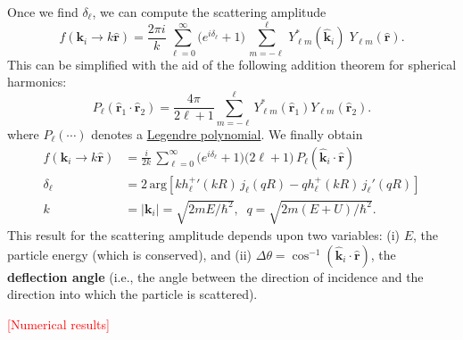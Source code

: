 \documentclass[pra,12pt]{revtex4}
\begin{document}
Once we find $\delta_\ell$, we can compute the scattering amplitude
$$f(\mathbf{k}_i\rightarrow k\hat{\mathbf{r}}) = \frac{2 \pi i}{k}\, \sum_{\ell =0}^\infty \big(e^{i\delta_\ell} + 1\big) \, \sum_{m=-\ell}^\ell \,Y_{\ell m}^*(\hat{\mathbf{k}}_i)\; Y_{\ell m}(\hat{\mathbf{r}}).$$
This can be simplified with the aid of the following addition theorem
for spherical harmonics:
$$P_\ell(\hat{\mathbf{r}}_1\cdot\hat{\mathbf{r}}_2) = \frac{4\pi}{2\ell+1} \sum_{m=-\ell}^{\ell} Y_{\ell m}^*(\hat{\mathbf{r}}_1) Y_{\ell m}(\hat{\mathbf{r}}_2).$$
where $P_\ell(\cdots)$ denotes a
\href{https://en.wikipedia.org/wiki/Legendre_polynomials}{Legendre
  polynomial}.  We finally obtain
$$\boxed{\quad\begin{aligned}f(\mathbf{k}_i \rightarrow k\hat{\mathbf{r}}) &= \frac{i}{2k}\, \sum_{\ell =0}^\infty \big(e^{i\delta_\ell} + 1\big) \big(2\ell+1\big)\, P_{\ell}(\hat{\mathbf{k}}_i\cdot \hat{\mathbf{r}}) \\ \delta_\ell &= 2\,\mathrm{arg}\!\left[k{h_\ell^+}'(kR) \, j_\ell(qR) - qh_\ell^+(kR)\, j_\ell'(qR)\right] \\ k &= |\mathbf{k}_i| = \sqrt{2mE/\hbar^2}, \;\; q = \sqrt{2m(E+U)/\hbar^2}.\end{aligned}\quad}$$
This result for the scattering amplitude depends upon two variables:
(i) $E$, the particle energy (which is conserved), and (ii) $\Delta
\theta = \cos^{-1}(\hat{\mathbf{k}}_i\cdot \hat{\mathbf{r}})$, the
\textbf{deflection angle} (i.e., the angle between the direction of
incidence and the direction into which the particle is scattered).



\textcolor{red}{[Numerical results]}
\end{document}
